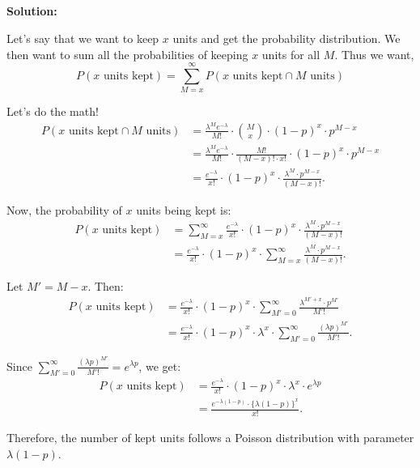 \documentclass{article}
\newenvironment{solution}
  {\par\noindent\textbf{Solution:}\par}
  {\par}
\begin{document}
\subsection{}
\begin{solution}
Let's say that we want to keep $x$ units and get the probability distribution. We then want to sum all the probabilities
of keeping $x$ units for all $M$. Thus we want,
$$P(x \text{ units kept}) = \sum_{M=x}^\infty P(x \text{ units kept} \cap M \text{ units})$$

Let's do the math!
\begin{align*}
P(x \text{ units kept} \cap M \text{ units}) 
&= \frac{\lambda^M e^{-\lambda}}{M!} \cdot {M \choose x} \cdot (1-p)^x \cdot p^{M-x} \\
&= \frac{\lambda^M e^{-\lambda}}{M!} \cdot \frac{M!}{(M-x)! \cdot x!} \cdot (1-p)^x \cdot p^{M-x} \\
&= \frac{e^{-\lambda}}{x!} \cdot (1-p)^x \cdot \frac{\lambda^M \cdot p^{M-x}}{(M-x)!}.
\end{align*}

Now, the probability of \(x\) units being kept is:
\begin{align*}
P(x \text{ units kept}) 
&= \sum_{M=x}^\infty \frac{e^{-\lambda}}{x!} \cdot (1-p)^x \cdot \frac{\lambda^M \cdot p^{M-x}}{(M-x)!} \\
&= \frac{e^{-\lambda}}{x!} \cdot (1-p)^x \cdot \sum_{M=x}^\infty \frac{\lambda^M \cdot p^{M-x}}{(M-x)!}.
\end{align*}

Let \(M' = M - x\). Then:
\begin{align*}
P(x \text{ units kept}) 
&= \frac{e^{-\lambda}}{x!} \cdot (1-p)^x \cdot \sum_{M'=0}^\infty \frac{\lambda^{M'+x} \cdot p^{M'}}{M'!} \\
&= \frac{e^{-\lambda}}{x!} \cdot (1-p)^x \cdot \lambda^x \cdot \sum_{M'=0}^\infty \frac{(\lambda p)^{M'}}{M'!}.
\end{align*}

Since \(\sum_{M'=0}^\infty \frac{(\lambda p)^{M'}}{M'!} = e^{\lambda p}\), we get:
\begin{align*}
P(x \text{ units kept}) 
&= \frac{e^{-\lambda}}{x!} \cdot (1-p)^x \cdot \lambda^x \cdot e^{\lambda p} \\
&= \frac{e^{-\lambda(1-p)} \cdot \{\lambda(1-p)\}^x}{x!}.
\end{align*}

Therefore, the number of kept units follows a Poisson distribution with parameter \(\lambda(1-p)\).
\end{solution}
\end{document}
